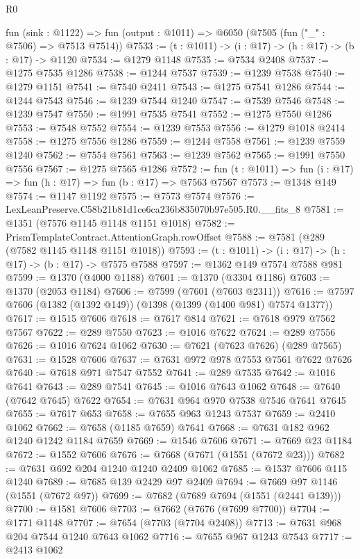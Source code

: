 \begin{lexlean}{R0}
\begin{coremodule}
  fun (sink : @1122) => fun (output : @1011) => @6050 (@7505 (fun ("_" : @7506) => @7513 @7514))
@7533 := (t : @1011) -> (i : @17) -> (h : @17) -> (b : @17) -> @1120
@7534 := @1279 @1148
@7535 := @7534 @2408
@7537 := @1275 @7535 @1286
@7538 := @1244 @7537
@7539 := @1239 @7538
@7540 := @1279 @1151
@7541 := @7540 @2411
@7543 := @1275 @7541 @1286
@7544 := @1244 @7543
@7546 := @1239 @7544 @1240
@7547 := @7539 @7546
@7548 := @1239 @7547
@7550 := @1991 @7535 @7541
@7552 := @1275 @7550 @1286
@7553 := @7548 @7552
@7554 := @1239 @7553
@7556 := @1279 @1018 @2414
@7558 := @1275 @7556 @1286
@7559 := @1244 @7558
@7561 := @1239 @7559 @1240
@7562 := @7554 @7561
@7563 := @1239 @7562
@7565 := @1991 @7550 @7556
@7567 := @1275 @7565 @1286
@7572 := fun (t : @1011) => fun (i : @17) => fun (h : @17) => fun (b : @17) => @7563 @7567
@7573 := @1348 @149
@7574 := @1147 @1192
@7575 := @7573 @7574
@7576 := LexLeanPreserve.C58b21b81d1ce6ca236b835070b97e505.R0.__fits_8
@7581 := @1351 (@7576 @1145 @1148 @1151 @1018)
@7582 := PrismTemplateContract.AttentionGraph.rowOffset
@7588 := @7581 (@289 (@7582 @1145 @1148 @1151 @1018))
@7593 := (t : @1011) -> (i : @17) -> (h : @17) -> (b : @17) -> @7575 @7588
@7597 := @1362 @149 @7574 @7588 @981
@7599 := @1370 (@4000 @1188)
@7601 := @1370 (@3304 @1186)
@7603 := @1370 (@2053 @1184)
@7606 := @7599 (@7601 (@7603 @2311))
@7616 := @7597 @7606 (@1382 (@1392 @149)) (@1398 (@1399 (@1400 @981) @7574 @1377))
@7617 := @1515 @7606
@7618 := @7617 @814
@7621 := @7618 @979 @7562 @7567
@7622 := @289 @7550
@7623 := @1016 @7622
@7624 := @289 @7556
@7626 := @1016 @7624 @1062
@7630 := @7621 (@7623 @7626) (@289 @7565)
@7631 := @1528 @7606
@7637 := @7631 @972 @978 @7553 @7561 @7622 @7626
@7640 := @7618 @971 @7547 @7552
@7641 := @289 @7535
@7642 := @1016 @7641
@7643 := @289 @7541
@7645 := @1016 @7643 @1062
@7648 := @7640 (@7642 @7645) @7622
@7654 := @7631 @964 @970 @7538 @7546 @7641 @7645
@7655 := @7617 @653
@7658 := @7655 @963 @1243 @7537
@7659 := @2410 @1062
@7662 := @7658 (@1185 @7659) @7641
@7668 := @7631 @182 @962 @1240 @1242 @1184 @7659
@7669 := @1546 @7606
@7671 := @7669 @23 @1184
@7672 := @1552 @7606
@7676 := @7668 (@7671 (@1551 (@7672 @23)))
@7682 := @7631 @692 @204 @1240 @1240 @2409 @1062
@7685 := @1537 @7606 @115 @1240
@7689 := @7685 @139 @2429 @97 @2409
@7694 := @7669 @97 @1146 (@1551 (@7672 @97))
@7699 := @7682 (@7689 @7694 (@1551 (@2441 @139)))
@7700 := @1581 @7606
@7703 := @7662 (@7676 (@7699 @7700))
@7704 := @1771 @1148
@7707 := @7654 (@7703 (@7704 @2408))
@7713 := @7631 @968 @204 @7544 @1240 @7643 @1062
@7716 := @7655 @967 @1243 @7543
@7717 := @2413 @1062

\end{coremodule}
\end{lexlean}
